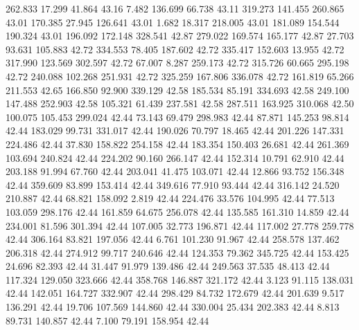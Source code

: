 262.833   17.299   41.864        43.16
   7.482  136.699   66.738        43.11
 319.273  141.455  260.865        43.01
 170.385   27.945  126.641        43.01
   1.682   18.317  218.005        43.01
 181.089  154.544  190.324        43.01
 196.092  172.148  328.541        42.87
 279.022  169.574  165.177        42.87
  27.703   93.631  105.883        42.72
 334.553   78.405  187.602        42.72
 335.417  152.603   13.955        42.72
 317.990  123.569  302.597        42.72
  67.007    8.287  259.173        42.72
 315.726   60.665  295.198        42.72
 240.088  102.268  251.931        42.72
 325.259  167.806  336.078        42.72
 161.819   65.266  211.553        42.65
 166.850   92.900  339.129        42.58
 185.534   85.191  334.693        42.58
 249.100  147.488  252.903        42.58
 105.321   61.439  237.581        42.58
 287.511  163.925  310.068        42.50
 100.075  105.453  299.024        42.44
  73.143   69.479  298.983        42.44
  87.871  145.253   98.814        42.44
 183.029   99.731  331.017        42.44
 190.026   70.797   18.465        42.44
 201.226  147.331  224.486        42.44
  37.830  158.822  254.158        42.44
 183.354  150.403   26.681        42.44
 261.369  103.694  240.824        42.44
 224.202   90.160  266.147        42.44
 152.314   10.791   62.910        42.44
 203.188   91.994   67.760        42.44
 203.041   41.475  103.071        42.44
  12.866   93.752  156.348        42.44
 359.609   83.899  153.414        42.44
 349.616   77.910   93.444        42.44
 316.142   24.520  210.887        42.44
  68.821  158.092    2.819        42.44
 224.476   33.576  104.995        42.44
  77.513  103.059  298.176        42.44
 161.859   64.675  256.078        42.44
 135.585  161.310   14.859        42.44
 234.001   81.596  301.394        42.44
 107.005   32.773  196.871        42.44
 117.002   27.778  259.778        42.44
 306.164   83.821  197.056        42.44
   6.761  101.230   91.967        42.44
 258.578  137.462  206.318        42.44
 274.912   99.717  240.646        42.44
 124.353   79.362  345.725        42.44
 153.425   24.696   82.393        42.44
  31.447   91.979  139.486        42.44
 249.563   37.535   48.413        42.44
 117.324  129.050  323.666        42.44
 358.768  146.887  321.172        42.44
   3.123   91.115  138.031        42.44
 142.051  164.727  332.907        42.44
 298.429   84.732  172.679        42.44
 201.639    9.517  136.291        42.44
  19.706  107.569  144.860        42.44
 330.004   25.434  202.383        42.44
   8.813   89.731  140.857        42.44
   7.100   79.191  158.954        42.44

